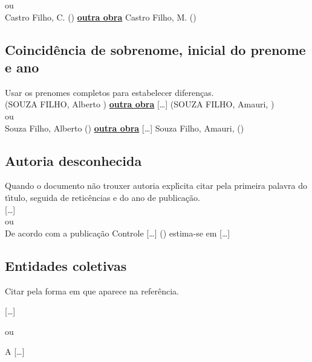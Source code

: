 ou\\

Castro Filho, C. (\citeyear{CastroC2012}) \textbf{\underline{outra obra}}    Castro Filho, M. (\citeyear{CastroC2012})

\subsection{Coincid\^encia de sobrenome, inicial do prenome e ano}

Usar os prenomes completos para estabelecer diferen\c{c}as. \\

 (SOUZA FILHO, Alberto \citeyear{Souza2015}) \textbf{\underline{outra obra}}   [\ldots] (SOUZA FILHO, Amauri, \citeyear{Souza2015}) \\


ou\\


Souza Filho, Alberto (\citeyear{Souza2015}) \textbf{\underline{outra obra}}   [\ldots] Souza Filho, Amauri, (\citeyear{Souza2015}) \\


\subsection{Autoria desconhecida}

Quando o documento n\~ao trouxer autoria expl\'{\i}cita citar pela primeira palavra do t\'{\i}tulo, seguida de retic\^encias e do ano de publica\c{c}\~ao.\\

[\ldots] \cite{Controle2015}\\

ou \\

De acordo com a publica\c{c}\~ao Controle [\ldots] (\citeyear{Controle2015}) estima-se em [\ldots]\\


\subsection{Entidades coletivas}

Citar pela forma em que aparece na refer\^encia.\\
\newpage

[\ldots] \cite{Sergipe2010}

ou 

A  [\ldots] \\


